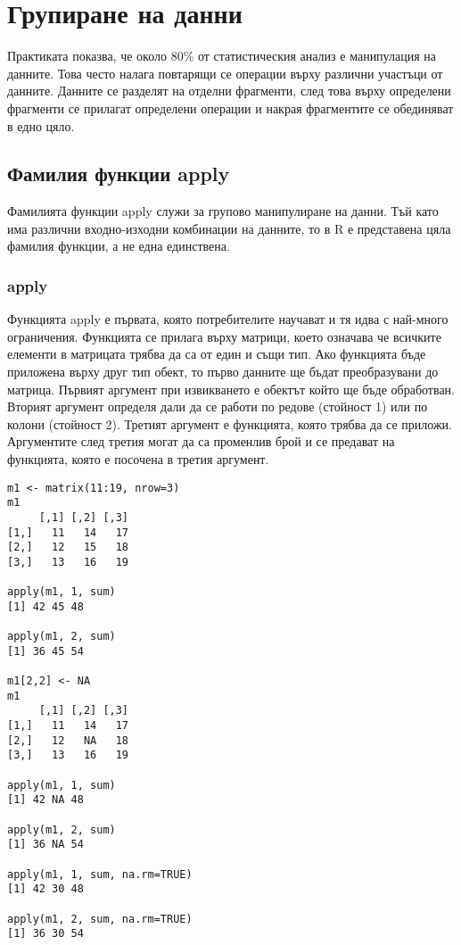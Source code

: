 ﻿\newpage
\chapter{Групиране на данни}
\label{chapter06}

Практиката показва, че около 80\% от статистическия анализ е манипулация на данните. Това често налага повтарящи се операции върху различни участъци от данните. Данните се разделят на отделни фрагменти, след това върху определени фрагменти се прилагат определени операции и накрая фрагментите се обединяват в едно цяло. 

\section{Фамилия функции apply}

Фамилията функции apply служи за групово манипулиране на данни. Тъй като има различни входно-изходни комбинации на данните, то в R е представена цяла фамилия функции, а не една единствена.

\subsection{apply}

Функцията apply е първата, която потребителите научават и тя идва с най-много ограничения. Функцията се прилага върху матрици, което означава че всичките елементи в матрицата трябва да са от един и същи тип. Ако функцията бъде приложена върху друг тип обект, то първо данните ще бъдат преобразувани до матрица. Първият аргумент при извикването е обектът който ще бъде обработван. Вторият аргумент определя дали да се работи по редове (стойност 1) или по колони (стойност 2). Третият аргумент е функцията, която трябва да се приложи. Аргументите след третия могат да са променлив брой и се предават на функцията, която е посочена в третия аргумент. 

\begin{lstlisting}[caption=Сума по редове и колони, label=listing0093]
m1 <- matrix(11:19, nrow=3)
m1
     [,1] [,2] [,3]
[1,]   11   14   17
[2,]   12   15   18
[3,]   13   16   19
 
apply(m1, 1, sum)
[1] 42 45 48
 
apply(m1, 2, sum)
[1] 36 45 54

m1[2,2] <- NA
m1
     [,1] [,2] [,3]
[1,]   11   14   17
[2,]   12   NA   18
[3,]   13   16   19

apply(m1, 1, sum)
[1] 42 NA 48

apply(m1, 2, sum)
[1] 36 NA 54

apply(m1, 1, sum, na.rm=TRUE)
[1] 42 30 48

apply(m1, 2, sum, na.rm=TRUE)
[1] 36 30 54
\end{lstlisting}

